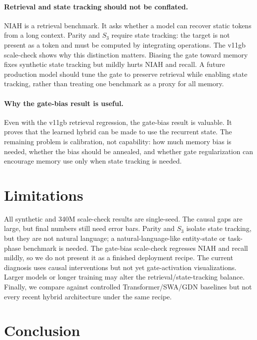 \documentclass[letterpaper]{article}
\begin{document}
\paragraph{Retrieval and state tracking should not be conflated.}
NIAH is a retrieval benchmark. It asks whether a model can recover static tokens from a long context. Parity and $S_3$ require state tracking: the target is not present as a token and must be computed by integrating operations. The v11gb scale-check shows why this distinction matters. Biasing the gate toward memory fixes synthetic state tracking but mildly hurts NIAH and recall. A future production model should tune the gate to preserve retrieval while enabling state tracking, rather than treating one benchmark as a proxy for all memory.

\paragraph{Why the gate-bias result is useful.}
Even with the v11gb retrieval regression, the gate-bias result is valuable. It proves that the learned hybrid can be made to use the recurrent state. The remaining problem is calibration, not capability: how much memory bias is needed, whether the bias should be annealed, and whether gate regularization can encourage memory use only when state tracking is needed.

\section{Limitations}

All synthetic and 340M scale-check results are single-seed. The causal gaps are large, but final numbers still need error bars. Parity and $S_3$ isolate state tracking, but they are not natural language; a natural-language-like entity-state or task-phase benchmark is needed. The gate-bias scale-check regresses NIAH and recall mildly, so we do not present it as a finished deployment recipe. The current diagnosis uses causal interventions but not yet gate-activation visualizations. Larger models or longer training may alter the retrieval/state-tracking balance. Finally, we compare against controlled Transformer/SWA/GDN baselines but not every recent hybrid architecture under the same recipe.

\section{Conclusion}
\end{document}
